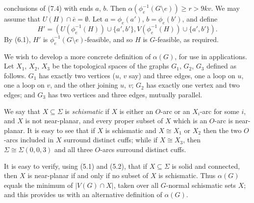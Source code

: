 \noindent conclusions of (7.4) with ends $a$, $b$. Then $\alpha(\phi_e^{-1}(G \setminus e)) \ge r > 9kv$. We may assume that $U(H) \cap \bar{e} = \emptyset$. Let $a = \phi_e(a')$, $b = \phi_e(b')$, and define
\begin{equation*}
H' = (U(\phi_e^{-1}(H)) \cup \{a', b'\}, V(\phi_e^{-1}(H)) \cup \{a', b'\}).
\end{equation*}
By (6.1), $H'$ is $\phi_e^{-1}(G \setminus e)$-feasible, and so $H$ is $G$-feasible, as required.


We wish to develop a more concrete definition of $\alpha(G)$, for use in applications. Let $X_1$, $X_2$, $X_3$ be the topological spaces of the graphs $G_1$, $G_2$, $G_3$ defined as follows. $G_1$ has exactly two vertices ($u$, $v$ say) and three edges, one a loop on $u$, one a loop on $v$, and the other joining $u$, $v$; $G_2$ has exactly one vertex and two edges; and $G_3$ has two vertices and three edges, mutually parallel.

We say that $X \subseteq \Sigma$ is \textit{schismatic} if $X$ is either an $O$-arc or an $X_i$-arc for some $i$, and $X$ is not near-planar, and every proper subset of $X$ which is an $O$-arc is near-planar. It is easy to see that if $X$ is schismatic and $X \cong X_1$ or $X_2$ then the two $O$-arcs included in $X$ surround distinct cuffs; while if $X \cong X_3$, then $\Sigma \cong \Sigma(0, 0, 3)$ and all three $O$-arcs surround distinct cuffs.

It is easy to verify, using (5.1) and (5.2), that if $X \subseteq \Sigma$ is solid and connected, then $X$ is near-planar if and only if no subset of $X$ is schismatic. Thus $\alpha(G)$ equals the minimum of $|V(G) \cap X|$, taken over all $G$-normal schismatic sets $X$; and this provides us with an alternative definition of $\alpha(G)$.

